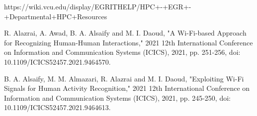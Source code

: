 \documentclass[conference]{IEEEtran}
\begin{document}
\begin{thebibliography}{00}
https://wiki.vcu.edu/display/EGRITHELP/HPC+-+EGR+-+Departmental+HPC+Resources

R. Alazrai, A. Awad, B. A. Alsaify and M. I. Daoud, "A Wi-Fi-based Approach for Recognizing Human-Human Interactions," 2021 12th International Conference on Information and Communication Systems (ICICS), 2021, pp. 251-256, doi: 10.1109/ICICS52457.2021.9464570.

 B. A. Alsaify, M. M. Almazari, R. Alazrai and M. I. Daoud, "Exploiting Wi-Fi Signals for Human Activity Recognition," 2021 12th International Conference on Information and Communication Systems (ICICS), 2021, pp. 245-250, doi: 10.1109/ICICS52457.2021.9464613.

\end{thebibliography}
\end{document}
